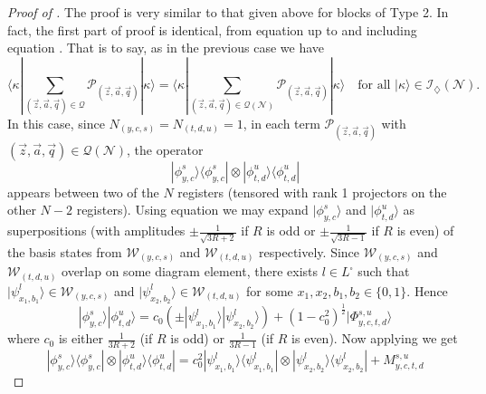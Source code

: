 \documentclass[../thesis-main/thesis-main]{subfiles}
\begin{document}
\begin{proof}[Proof of \protect{}]
The proof is very similar to that given above for blocks of Type 2. In fact, the first part of proof is identical, from equation  up to and including equation . That is to say, as in the previous case we have
\begin{equation}
\langle\kappa|\sum_{(\vec{z},\vec{a},\vec{q})\in\mathcal{Q}}\mathcal{P}_{(\vec{z},\vec{a},\vec{q})}|\kappa\rangle=\langle\kappa|\sum_{(\vec{z},\vec{a},\vec{q})\in\mathcal{Q}(\mathcal{N})}\mathcal{P}_{(\vec{z},\vec{a},\vec{q})}|\kappa\rangle\quad\text{for all }|\kappa\rangle\in\mathcal{I}_{\diamondsuit}(\mathcal{N}).\label{eq:restrict_attention_mathcalN-1}
\end{equation}
In this case, since $N_{(y,c,s)}=N_{(t,d,u)}=1$, in each term $\mathcal{P}_{(\vec{z},\vec{a},\vec{q})}$ with $(\vec{z},\vec{a},\vec{q})\in\mathcal{Q}(\mathcal{N})$, the operator 
\begin{equation}
|\phi_{y,c}^{s}\rangle\langle\phi_{y,c}^{s}|\otimes|\phi_{t,d}^{u}\rangle\langle\phi_{t,d}^{u}|
\end{equation}
appears between two of the $N$ registers (tensored with rank 1 projectors on the other $N-2$ registers). Using equation  we may expand $|\phi_{y,c}^{s}\rangle$ and $|\phi_{t,d}^{u}\rangle$ as superpositions (with amplitudes $\pm\frac{1}{\sqrt{3R+2}}$ if $R$ is odd or $\pm\frac{1}{\sqrt{3R-1}}$ if $R$ is even) of the basis states from $\mathcal{W}_{(y,c,s)}$ and $\mathcal{W}_{(t,d,u)}$ respectively. Since $\mathcal{W}_{(y,c,s)}$ and $\mathcal{W}_{(t,d,u)}$ overlap on some diagram element, there exists $l\in L^{\square}$ such that $|\psi_{x_{1},b_{1}}^{l}\rangle\in\mathcal{W}_{(y,c,s)}$ and $|\psi_{x_{2},b_{2}}^{l}\rangle\in\mathcal{W}_{(t,d,u)}$ for some $x_{1},x_{2},b_{1},b_{2}\in\{0,1\}$. Hence
\begin{equation}
|\phi_{y,c}^{s}\rangle|\phi_{t,d}^{u}\rangle=c_{0}\left(\pm|\psi_{x_{1},b_{1}}^{l}\rangle|\psi_{x_{2},b_{2}}^{l}\rangle\right)+\left(1-c_{0}^{2}\right)^{\frac{1}{2}}|\Phi_{y,c,t,d}^{s,u}\rangle
\end{equation}
where $c_{0}$ is either $\frac{1}{3R+2}$ (if $R$ is odd) or $\frac{1}{3R-1}$ (if $R$ is even). Now applying  we get
\begin{equation}
|\phi_{y,c}^{s}\rangle\langle\phi_{y,c}^{s}|\otimes|\phi_{t,d}^{u}\rangle\langle\phi_{t,d}^{u}|=c_{0}^{2}|\psi_{x_{1},b_{1}}^{l}\rangle\langle\psi_{x_{1},b_{1}}^{l}|\otimes|\psi_{x_{2},b_{2}}^{l}\rangle\langle\psi_{x_{2},b_{2}}^{l}|+M_{y,c,t,d}^{s,u}\label{eq:expand_phi_phi_proj-1-1}

\end{equation}
\end{proof}
\end{document}
